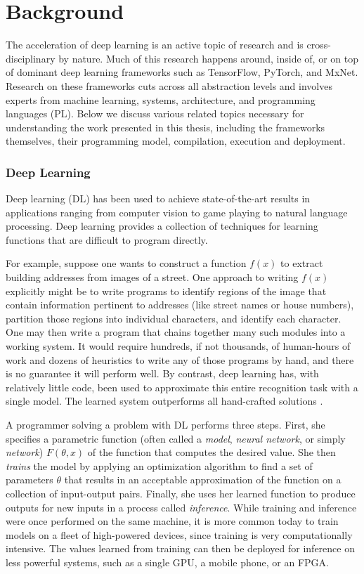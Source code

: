 \chapter{Background}
\label{ch:related}

The acceleration of deep learning is an active topic of research and is
  cross-disciplinary by nature.
Much of this research happens around, inside of, or on top of
  dominant deep learning frameworks such as TensorFlow, PyTorch, and MxNet.
Research on these frameworks cuts across all abstraction levels and
  involves experts from machine learning, systems, architecture, and programming languages (PL).
Below we discuss various related topics necessary for understanding the work presented
  in this thesis, including the frameworks themselves, their programming model, compilation, execution and deployment.

\subsection{Deep Learning}

Deep learning (DL) has been used to achieve state-of-the-art results in
  applications ranging from computer vision to game
  playing to natural language processing.
Deep learning provides a collection of techniques for learning functions that are difficult
  to program directly.


For example, suppose one wants to construct a function $f(x)$ to extract building addresses from
images of a street. One approach to writing $f(x)$ explicitly might be to write programs to identify
regions of the image that contain information pertinent to addresses (like street names or house
numbers), partition those regions into individual characters, and identify each character.
One may then write a program that chains together many such modules into a working system.
It would require hundreds, if not thousands, of human-hours of work and dozens of heuristics to
write any of those programs by hand, and there is no guarantee it will perform well.
By contrast, deep learning has, with relatively little code, been
used to approximate this entire recognition task with a single model. The learned system
outperforms all hand-crafted solutions \citep{streetview}.

A programmer solving a problem with DL performs three steps.
First, she specifies a parametric function (often called a \textit{model},
  \textit{neural network}, or simply \textit{network}) $F(\theta, x)$ of the function
  that computes the desired value.
She then \textit{trains} the model by applying an optimization algorithm to find a set of
  parameters $\theta$ that results in an acceptable approximation of the function on a
  collection of input-output pairs.
Finally, she uses her learned function to produce outputs for new inputs in
  a process called \textit{inference}.
While training and inference were once performed on the same machine,
  it is more common today to train models on a fleet of high-powered devices,
  since training is very computationally intensive.
The values learned from training can then be deployed for inference on less powerful systems,
  such as a single GPU, a mobile phone, or an FPGA.

